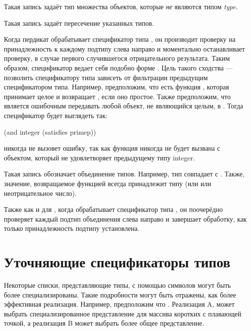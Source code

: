 \begin{flushdesc}
\item[\cd{(not \emph{type})}]
  Такая запись задаёт тип множества объектов, которые \emph{не} являются типом
  \emph{type}. 

\item[\cd{(and \emph{type1} \emph{type2} ...)}]
  Такая запись задаёт пересечение указанных типов.

  Когда пердикат  обрабатывает спецификатор типа , он
  производит проверку на принадлежность к каждому подтипу слева направо и
  моментально останавливает проверку, в случае первого случившегося отрицательного
  результата. Таким образом, спецификатор  ведает себя подобно форме
  . Цель такого сходства --- позволить спецификатору типа 
  зависеть от фильтрации предыдущим спецификатором типа. Например, предположим,
  что есть функция , которая принимает целое и возвращает {\true},
  если оно простое. Также предположим, что является ошибочным передавать любой
  объект, не являющийся целым, в . Тогда спецификатор будет выглядеть
  так:
  \begin{lisp}
    (and integer (satisfies primep))
  \end{lisp}
  никогда не вызовет ошибку, так как функция  никогда не будет вызвана
  с объектом, который не удовлетворяет предыдущему типу integer.

\item[\cd{(or \emph{type1} \emph{type2} ...)}]
  Такая запись обозначает объединение типов. Например, тип  совпадает с
  . Также, значение, возвращаемое функцией  всегда
  принадлежит типу  (или {\nil} или неотрицательное число).

  Также как и для , когда  обрабатывает спецификатор типа
  , он поочерёдно проверяет каждый подтип объединения слева направо и
  завершает обработку, как только принадлежность подтипу установлена.
\end{flushdesc}

\section{Уточняющие спецификаторы типов}
\label{SPECIALIZED-TYPE-SPECIFIER-SECTION}

Некоторые списки, представляющие типы, с помощью символов могут быть более
специализированы. Такие подробности могут быть отражены, как более эффективная
реализация. Например, предположим что . Реализация A,
может выбрать специализированное представление для массива коротких с плавающей
точкой, а реализация B может выбрать более общее представление.

